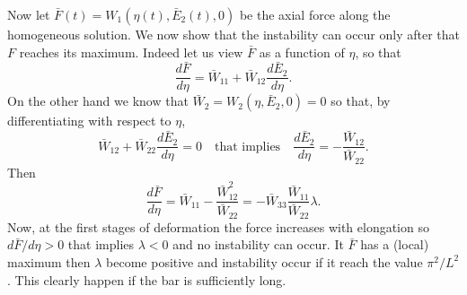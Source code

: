 \documentclass[a4paper,10pt,twoside]{amsbook}
\numberwithin{section}{chapter}
\numberwithin{equation}{chapter}
\theoremstyle{definition}
\newcommand{\dind}[2]{\frac{\partial #1}{\partial #2}}
\begin{document}

Now let $\bar{F}(t)=W_1(\eta(t),\bar{E}_2(t),0)$ be the axial force along the homogeneous solution. We now show that the instability can occur only after that $F$ reaches its maximum. Indeed let us view $\bar{F}$ as a function of $\eta$, so that
\[
\frac{d\bar{F}}{d\eta}=\bar W_{11}+\bar W_{12}\frac{d\bar E_2}{d\eta}.
\]
On the other hand we know that $\bar W_2=W_2(\eta,\bar{E}_2,0)=0$ so that, by differentiating with respect to $\eta$,
\[
\bar W_{12}+\bar W_{22}\frac{d\bar E_2}{d\eta}=0\quad\text{that implies}\quad\frac{d\bar E_2}{d\eta}=-\frac{\bar W_{12}}{\bar W_{22}}.
\]
Then
\[
\frac{d\bar F}{d\eta}=\bar W_{11}-\frac{\bar W_{12}^2}{\bar W_{22}}=-\bar W_{33}\frac{\bar W_{11}}{\bar W_{22}}\lambda.
\]
Now, at the first stages of deformation the force increases with elongation so $d\bar F/d\eta>0$ that implies $\lambda<0$ and no instability can occur. It $\bar{F}$ has a (local) maximum then $\lambda$ become positive and instability occur if it reach the value $\pi^2/L^2$. This clearly happen if the bar is sufficiently long.
\end{document}

